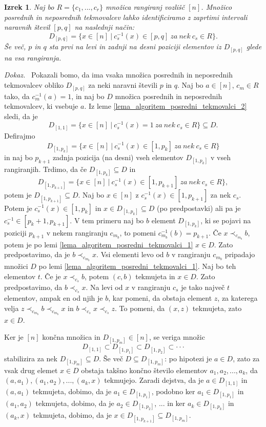 \documentclass[a4paper, 12pt]{book}
\newtheorem{izrek}{Izrek}[chapter]
\newenvironment{dokaz}{\emph{Dokaz.}\ }{\hspace{\fill}{$\Box$}}
\begin{document}
\begin{izrek}
    Naj bo $R = \{ c_1, ..., c_r \}$ množica rangiranj vozlišč $[n]$. Množico posrednih in neposrednih tekmovalcev lahko identificiramo z zaprtimi intervali naravnih števil $[p, q]$ na naslednji način: 
    \[
        D_{[p, q]} = \{ x \in [n] \ | \ c_s^{-1}(x) \in [p, q] \ za \ nek \ c_s \in R\}.
    \]
    Še več, $p$ in $q$ sta prvi na levi in zadnji na desni poziciji elementov iz $D_{[p, q]}$ glede na vsa rangiranja.
\end{izrek}
\begin{dokaz}
    Pokazali bomo, da ima vsaka množica posrednih in neposrednih tekmovalcev obliko $D_{[p, q]}$ za neki naravni števili $p$ in $q$. Naj bo $a \in [n]$, $c_m \in R$ tako, da $c_m^{-1}(a) = 1$, in naj bo $D$ množica posrednih in neposrednih tekmovalcev, ki vsebuje $a$. Iz leme \ref{lema_algoritem_posredni_tekmovalci_2} sledi, da je 
    \[ 
        D_{[1,1]} = \{ x \in [n] \ | \ c_s^{-1}(x) = 1 \ za \ nek \ c_s \in R \} \subseteq D.
    \] 
    Defirajmo 
    \[
        D_{[1, p_k]} = \{ x \in [n] \ | \ c_s^{-1}(x) \in [1, p_k] \ za \ nek \ c_s \in R\}
    \] 
    in naj bo $p_{k+1}$ zadnja pozicija (na desni) vseh elementov $D_{[1, p_k]}$ v vseh rangiranjih. Trdimo, da če $D_{[1, p_k]} \subseteq D$ in 
    \[
        D_{[1, p_{k+1}]} = \{ x \in [n] \ | \ c_s^{-1}(x) \in [1, p_{k+1}] \ za \ nek \ c_s \in R\},
    \] 
    potem je $D_{[1, p_{k+1}]} \subseteq D$. Naj bo $x \in [n]$ z $c_s^{-1}(x) \in [1, p_{k+1}]$ za nek $c_s$. Potem je $c_s^{-1}(x) \in [1, p_k]$ in $x \in D_{[1, p_k]} \subseteq D$ (po predpostavki) ali pa je $c_s^{-1} \in [p_k + 1, p_{k+1}]$. V tem primeru naj bo $b$ element $D_{[1,p_k]}$, ki se pojavi na poziciji $p_{k+1}$ v nekem rangiranju $c_{m_b}$, to pomeni $c_{m_b}^{-1}(b) = p_{k+1}$. Če $x \prec_{c_{m_b}} b$, potem je po lemi \ref{lema_algoritem_posredni_tekmovalci_1} $x \in D$. Zato predpostavimo, da je $b \prec_{c_{m_b}} x$. Vsi elementi levo od $b$ v rangiranju $c_{m_b}$ pripadajo množici $D$ po lemi \ref{lema_algoritem_posredni_tekmovalci_1}. Naj bo teh elementov $t$. Če je $x \prec_{c_s} b$, potem $(c, b)$ tekmujeta in $x \in D$. Zato predpostavimo, da $b \prec_{c_s} x$. Na levi od $x$ v rangiranju $c_s$ je tako največ $t$ elementov, ampak en od njih je $b$, kar pomeni, da obstaja element $z$, za katerega velja $z \prec_{c_{m_b}} b \prec_{c_{m_b}} x$ in $b \prec_{c_s} x \prec_{c_s} z$. To pomeni, da $(x, z)$ tekmujeta, zato $x \in D$.

    Ker je $[n]$ končna množica in $D_{[1, p_m]} \in [n]$, se veriga množic 
    \[
        D_{[1, 1]} \subset D_{[1, p_1]} \subset D_{[1, p_2]} \subset \cdot\cdot\cdot    
    \]
    stabilizira za nek $D_{[1, p_m]} \subseteq D$. Še več $D \subseteq D_{[1, p_m]}$: po hipotezi je $a \in D$, zato za vsak drug elemet $x \in D$ obstaja takšno končno število elementov $a_1, a_2, ..., a_k$, da $(a, a_1),(a_1, a_2), ..., (a_k, x)$ tekmujejo. Zaradi dejstva, da je $a \in D_{[1, 1]}$ in $(a, a_1)$ tekmujeta, dobimo, da je $a_1 \in D_{[1, p_1]}$, podobno ker $a_1 \in D_{[1, p_1]}$ in $(a_1, a_2)$ tekmujeta, dobimo, da je $a_2 \in D_{[1, p_2]}$, ... in ker $a_{k} \in D_{[1, p_k]}$ in $(a_k, x)$ tekmujeta, dobimo, da je $x \in D_{[1, p_{k+1}]} \subseteq D_{[1, p_m]}$.


\end{dokaz}
\end{document}
